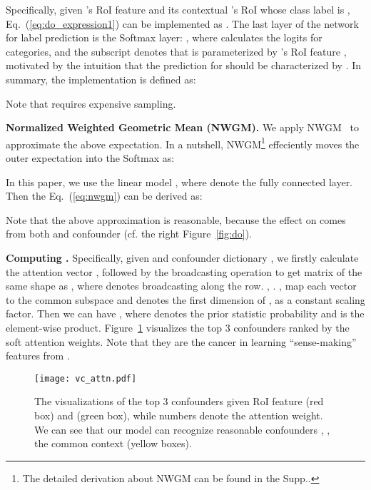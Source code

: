 \documentclass[10pt,twocolumn,letterpaper]{article}
\begin{document}
Specifically, given 's RoI feature  and its contextual 's RoI whose class label is , Eq.~(\ref{eq:do_expression1}) can be implemented as .
The last layer of the network for label prediction is the Softmax layer: , where  calculates the logits for  categories, and the subscript  denotes that  is parameterized by 's RoI feature , motivated by the intuition that the prediction for  should be characterized by . In summary, the implementation is defined as:
\vspace{-0.08cm}

Note that  requires expensive sampling.  


\noindent\textbf{Normalized Weighted Geometric Mean (NWGM).}
We apply NWGM~\cite{xu2015show} to approximate the above expectation. In a nutshell, NWGM\footnote{The detailed derivation about NWGM can be found in the Supp..} effeciently moves the outer expectation into the Softmax as:
\vspace{-0.08cm}

In this paper, we use the linear model , where  denote the fully connected layer.
Then the Eq.~(\ref{eq:nwgm}) can be derived as:
\vspace{-0.08cm}

Note that the above approximation is reasonable, because the effect on  comes from both  and confounder  (cf. the right Figure~\ref{fig:do}). 



\noindent\textbf{Computing .}
Specifically, given  and confounder dictionary , 
we firstly calculate the attention vector , followed by the broadcasting operation to get matrix  of the same shape as , where  denotes broadcasting along the row.
, .
,  map each vector to the common subspace and
 denotes the first dimension of ,  as a constant scaling factor.
Then we can have , where  denotes the prior statistic probability and  is the element-wise product.
Figure~\ref{fig:attn} visualizes the top 3 confounders ranked by the soft attention weights. Note that they are the cancer in learning ``sense-making'' features from . 






\begin{figure}[t]
\begin{center}
\texttt{[image: vc\_attn.pdf]}
\end{center}
\vspace{-0.2cm}
   \caption{The visualizations of the top 3 confounders given RoI feature  (red box) and  (green box), while numbers denote the attention weight. We can see that our model can recognize reasonable confounders , \eg, the common context (yellow boxes).} 
\label{fig:attn}
\vspace{-0.1in}
\end{figure}
\end{document}
